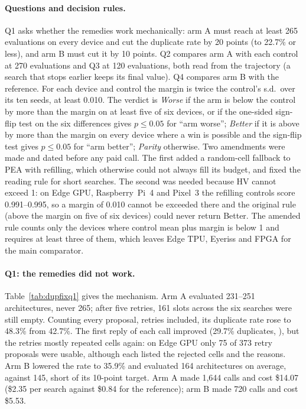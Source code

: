 \paragraph{Questions and decision rules.} Q1 asks whether the remedies work mechanically: arm A must reach at least 265 evaluations on every device and cut the duplicate rate by 20 points (to 22.7\% or less), and arm B must cut it by 10 points. Q2 compares arm A with each control at 270 evaluations and Q3 at 120 evaluations, both read from the trajectory (a search that stops earlier keeps its final value). Q4 compares arm B with the reference. For each device and control the margin is twice the control's s.d.\ over its ten seeds, at least 0.010. The verdict is \emph{Worse} if the arm is below the control by more than the margin on at least five of six devices, or if the one-sided sign-flip test on the six differences gives $p\le0.05$ for ``arm worse''; \emph{Better} if it is above by more than the margin on every device where a win is possible and the sign-flip test gives $p\le0.05$ for ``arm better''; \emph{Parity} otherwise. Two amendments were made and dated before any paid call. The first added a random-cell fallback to PEA with refilling, which otherwise could not always fill its budget, and fixed the reading rule for short searches. The second was needed because HV cannot exceed 1: on Edge GPU, Raspberry~Pi~4 and Pixel~3 the refilling controls score 0.991--0.995, so a margin of 0.010 cannot be exceeded there and the original rule (above the margin on five of six devices) could never return Better. The amended rule counts only the devices where control mean plus margin is below 1 and requires at least three of them, which leaves Edge TPU, Eyeriss and FPGA for the main comparator.

\paragraph{Q1: the remedies did not work.} Table~\ref{tab:dupfixq1} gives the mechanism. Arm A evaluated 231--251 architectures, never 265; after five retries, 161 slots across the six searches were still empty. Counting every proposal, retries included, its duplicate rate rose to 48.3\% from 42.7\%. The first reply of each call improved (29.7\% duplicates, ), but the retries mostly repeated cells again: on Edge GPU only 75 of 373 retry proposals were usable, although each listed the rejected cells and the reasons. Arm B lowered the rate to 35.9\% and evaluated 164 architectures on average, against 145, short of its 10-point target. Arm A made 1{,}644 calls and cost \$14.07 (\$2.35 per search against \$0.84 for the reference); arm B made 720 calls and cost \$5.53.

